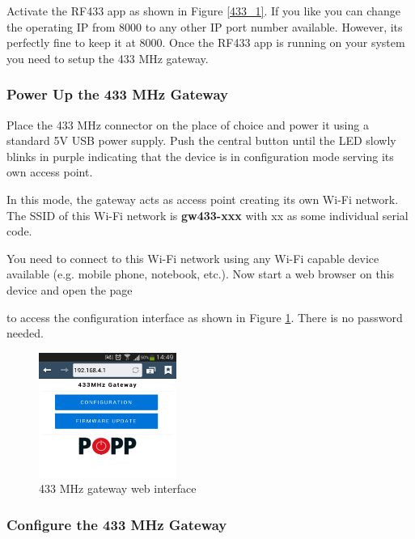 Activate the RF433 app as shown in Figure \ref{433_1}. If you like you can change the 
operating IP from 8000 to any other IP port number available. However, its perfectly fine 
to keep it at 8000. Once the RF433 app is running on your \zway system you need to setup 
the 433 MHz gateway.

\subsubsection {Power Up the 433 MHz Gateway}

Place the 433 MHz connector on the place of choice and power it using a standard 5V USB 
power supply. Push the central button until the LED slowly blinks in purple indicating that 
the device is in configuration mode serving its own access point.

In this mode, the gateway acts as access point creating its own Wi-Fi network. The SSID of 
this Wi-Fi network is \textbf{gw433-xxx} with xx as some individual serial code.

You need to connect to this Wi-Fi network using any Wi-Fi capable device available (e.g. 
mobile phone, notebook, etc.). Now start a web browser on this device and open the page 


to access the configuration interface as shown in Figure \ref{433_2}. 
There is no password needed.

\begin{figure}
\begin{center}
\includegraphics[width=0.4\textwidth]{pngs/cap9/433_2.png}
\caption{433 MHz gateway web interface}
\label{433_2}
\end{center}
\end{figure}

\subsubsection {Configure the 433 MHz Gateway}

